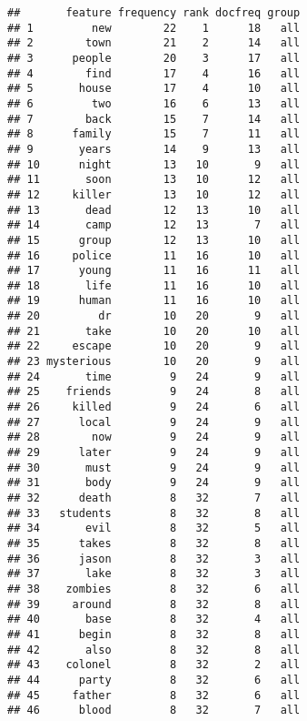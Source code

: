 \documentclass[
]{article}
\begin{document}
\begin{verbatim}
##       feature frequency rank docfreq group
## 1         new        22    1      18   all
## 2        town        21    2      14   all
## 3      people        20    3      17   all
## 4        find        17    4      16   all
## 5       house        17    4      10   all
## 6         two        16    6      13   all
## 7        back        15    7      14   all
## 8      family        15    7      11   all
## 9       years        14    9      13   all
## 10      night        13   10       9   all
## 11       soon        13   10      12   all
## 12     killer        13   10      12   all
## 13       dead        12   13      10   all
## 14       camp        12   13       7   all
## 15      group        12   13      10   all
## 16     police        11   16      10   all
## 17      young        11   16      11   all
## 18       life        11   16      10   all
## 19      human        11   16      10   all
## 20         dr        10   20       9   all
## 21       take        10   20      10   all
## 22     escape        10   20       9   all
## 23 mysterious        10   20       9   all
## 24       time         9   24       9   all
## 25    friends         9   24       8   all
## 26     killed         9   24       6   all
## 27      local         9   24       9   all
## 28        now         9   24       9   all
## 29      later         9   24       9   all
## 30       must         9   24       9   all
## 31       body         9   24       9   all
## 32      death         8   32       7   all
## 33   students         8   32       8   all
## 34       evil         8   32       5   all
## 35      takes         8   32       8   all
## 36      jason         8   32       3   all
## 37       lake         8   32       3   all
## 38    zombies         8   32       6   all
## 39     around         8   32       8   all
## 40       base         8   32       4   all
## 41      begin         8   32       8   all
## 42       also         8   32       8   all
## 43    colonel         8   32       2   all
## 44      party         8   32       6   all
## 45     father         8   32       6   all
## 46      blood         8   32       7   all
\end{verbatim}
\end{document}
